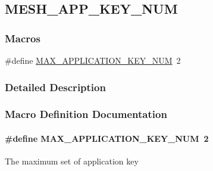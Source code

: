 \hypertarget{group___m_e_s_h___a_p_p___k_e_y___n_u_m}{}\subsection{M\+E\+S\+H\+\_\+\+A\+P\+P\+\_\+\+K\+E\+Y\+\_\+\+N\+UM}
\label{group___m_e_s_h___a_p_p___k_e_y___n_u_m}
\subsubsection*{Macros}
\begin{DoxyCompactItemize}
\item 
\#define \hyperlink{group___m_e_s_h___a_p_p___k_e_y___n_u_m_gac77a9999095f79330fc88bf8a24a1dc7}{M\+A\+X\+\_\+\+A\+P\+P\+L\+I\+C\+A\+T\+I\+O\+N\+\_\+\+K\+E\+Y\+\_\+\+N\+UM}~2
\end{DoxyCompactItemize}


\subsubsection{Detailed Description}


\subsubsection{Macro Definition Documentation}
\paragraph[{\texorpdfstring{M\+A\+X\+\_\+\+A\+P\+P\+L\+I\+C\+A\+T\+I\+O\+N\+\_\+\+K\+E\+Y\+\_\+\+N\+UM}{MAX_APPLICATION_KEY_NUM}}]{\setlength{\rightskip}{0pt plus 5cm}\#define M\+A\+X\+\_\+\+A\+P\+P\+L\+I\+C\+A\+T\+I\+O\+N\+\_\+\+K\+E\+Y\+\_\+\+N\+UM~2}\hypertarget{group___m_e_s_h___a_p_p___k_e_y___n_u_m_gac77a9999095f79330fc88bf8a24a1dc7}{}\label{group___m_e_s_h___a_p_p___k_e_y___n_u_m_gac77a9999095f79330fc88bf8a24a1dc7}
The maximum set of application key 